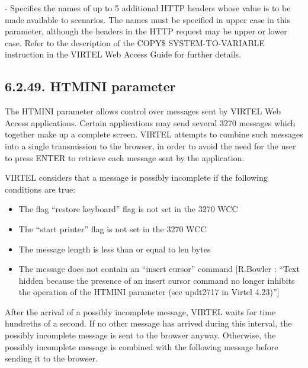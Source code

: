 \documentclass[letterpaper,10pt,english]{sphinxmanual}
\begin{document}
 - Specifies the names of up to 5 additional HTTP headers whose value is to be made available to scenarios. The names must be specified in upper case in this parameter, although the headers in the HTTP request may be upper or lower case. Refer to the description of the COPY\$ SYSTEM-TO-VARIABLE instruction in the VIRTEL Web Access Guide for further details.


\subsection{6.2.49. HTMINI parameter}
\label{\detokenize{Installation_Guide:htmini-parameter}}
\begin{sphinxVerbatim}[commandchars=\\\{\}]
                  
\end{sphinxVerbatim}

The HTMINI parameter allows control over messages sent by VIRTEL Web Access applications. Certain applications may send several 3270 messages which together make up a complete screen. VIRTEL attempts to combine such messages into a single transmission to the browser, in order to avoid the need for the user to press ENTER to retrieve each message sent by the application.

VIRTEL considers that a message is possibly incomplete if the following conditions are true:
\begin{itemize}
\item {} 
The flag “restore keyboard” flag is not set in the 3270 WCC

\item {} 
The “start printer” flag is not set in the 3270 WCC

\item {} 
The message length is less than or equal to len bytes

\item {} 
The message does not contain an “insert cursor” command {[}R.Bowler : “Text hidden because the presence of an insert cursor command no longer inhibits the operation of the HTMINI parameter (see updt2717 in Virtel 4.23)”{]}

\end{itemize}

After the arrival of a possibly incomplete message, VIRTEL waits for time hundreths of a second. If no other message has arrived during this interval, the possibly incomplete message is sent to the browser anyway. Otherwise, the possibly incomplete message is combined with the following message before sending it to the browser.
\end{document}
